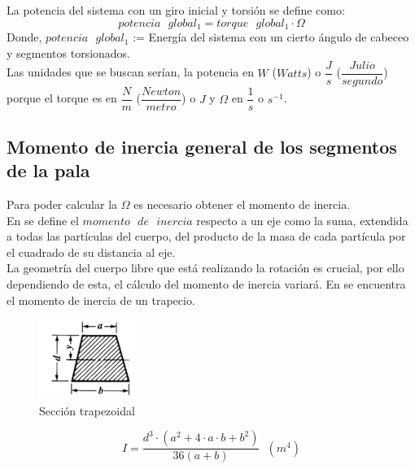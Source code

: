   La potencia del sistema con un giro inicial y torsión se define como:
   \begin{equation}
  potencia \text{ } global_1 = torque \text{ } global_1 \cdot \Omega  
 \label{def:potencia_giro_segmentos}
 \end{equation}
  Donde, $potencia \text{ } global_1$ := Energía del sistema con un cierto ángulo de cabeceo y segmentos torsionados.\\
 
Las unidades que se buscan serían, la potencia en $W$ ($Watts$) o $\dfrac{J}{s}$ ($\dfrac{Julio}{segundo}$) porque el torque es en $\dfrac{N}{m}$ ($\dfrac{Newton}{metro}$) o $J$ y $\Omega$ en $\dfrac{1}{s}$ o $s^{-1}$.

 
\subsection{Momento de inercia general de los segmentos de la pala}

Para poder calcular la $\Omega$ es necesario obtener el momento de inercia.\\

En \cite[p.~269]{goldstein1987mecanica} se define el $momento \text{ } de \text{ } inercia$ respecto a un eje como la suma, extendida a todas las partículas del cuerpo, del producto de la masa de cada partícula por el cuadrado de su distancia al eje.\\


La geometría del cuerpo libre que está realizando la rotación es crucial, por ello dependiendo de esta, el cálculo del momento de inercia variará. En \cite[p.~242]{oberg2012machinery} se encuentra el momento de inercia de un trapecio. \\


\begin{figure}[H]
    \centering
    \includegraphics[width=0.3\textwidth]{images/trapecio libro machinery.png}
    \caption{Sección trapezoidal}
    \label{fig:momento_inercia_libro}
\end{figure}



\begin{equation}
    I = \dfrac{ d^3 \cdot (a^2 + 4 \cdot a \cdot b + b^2)}{ 36 (a + b)} \hspace{7pt} (m^4) 
\end{equation}




